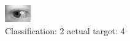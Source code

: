 \begin{figure}[h!]
\begin{center}
\includegraphics[width=0.60\columnwidth]{figures/ID717_class_2_target_4.png}
\end{center}
\caption{ Classification: 2 actual target: 4}
\label{fig:ID717_class_2_target_4}
\end{figure}

